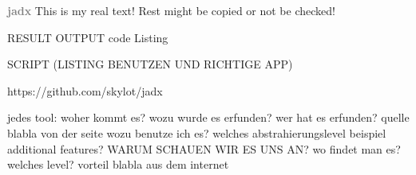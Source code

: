 \newline\newline\textbf{\textcolor{gray}{jadx}}\newline
This is my real text! Rest might be copied or not be checked!

RESULT OUTPUT
code Listing

SCRIPT (LISTING BENUTZEN UND RICHTIGE APP)


https://github.com/skylot/jadx


jedes tool:\newline
woher kommt es?\newline
wozu wurde es erfunden?\newline
wer hat es erfunden? quelle\newline
blabla von der seite\newline
wozu benutze ich es?\newline
welches abstrahierungslevel\newline
beispiel\newline
additional features?\newline
WARUM SCHAUEN WIR ES UNS AN?\newline
wo findet man es?\newline
welches level?\newline
vorteil\newline
blabla aus dem internet\newline

